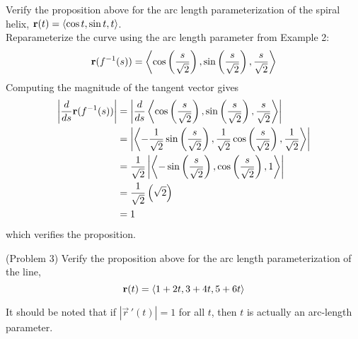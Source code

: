 \documentclass[handout]{ximera}
\begin{document}
\begin{example}[Example 3]
Verify the proposition above for the arc length parameterization of the spiral helix, $\mathbf r(t) = \left\langle \cos t, \sin t, t\right\rangle$.\\ 
Reparameterize the curve using the arc length parameter from Example 2:
\[
\mathbf r(f^{-1}(s)) = \left\langle \cos \left(\frac{s}{\sqrt 2}\right), \sin \left(\frac{s}{\sqrt 2}\right),\frac{s}{\sqrt 2}\right\rangle
\]
Computing the magnitude of the tangent vector gives
\begin{align*}
\left| \frac{d}{ds} \mathbf r(f^{-1}(s))\right| &=\left| \frac{d}{ds} \left\langle \cos \left(\frac{s}{\sqrt 2}\right), \sin \left(\frac{s}{\sqrt 2}\right),\frac{s}{\sqrt 2}\right\rangle\right|\\
&= \left| \left\langle  -\frac{1}{\sqrt 2} \sin\left(\frac{s}{\sqrt 2}\right), \frac{1}{\sqrt 2} \cos\left(\frac{s}{\sqrt 2}\right), \frac{1}{\sqrt 2}\right\rangle\right|\\
&= \frac{1}{\sqrt 2} \left|\left\langle -\sin\left(\frac{s}{\sqrt 2}\right),\cos\left(\frac{s}{\sqrt 2}\right),1\right\rangle \right|\\
&= \frac{1}{\sqrt 2} \left(\sqrt 2\right) \\
&= 1
\end{align*}
which verifies the proposition.
\end{example}

\begin{problem}(Problem 3)
Verify the proposition above for the arc length parameterization of the line, 
\[
\mathbf r(t) = \left\langle 1 + 2t, 3+4t, 5+6t\right\rangle
\]
\end{problem}




\begin{remark}
It should be noted that if $|\vec r\,'(t)| = 1$ for all $t$, then $t$ is actually an arc-length parameter.
\end{remark}
\end{document}
